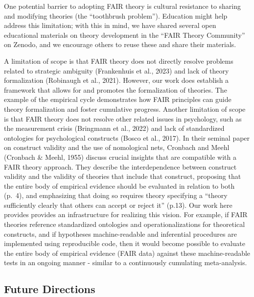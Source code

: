 \documentclass[man]{apa7}
\begin{document}
One potential barrier to adopting FAIR theory is cultural resistance to sharing and modifying theories (the ``toothbrush problem'').
Education might help address this limitation; with this in mind,
we have shared several open educational materials on theory development in the ``FAIR Theory Community'' on Zenodo, and we encourage others to reuse these and share their materials.

A limitation of scope is that FAIR theory does not directly resolve problems related to strategic ambiguity (Frankenhuis et al., 2023) and lack of theory formalization (Robinaugh et al., 2021).
However, our work does establish a framework that allows for and promotes the formalization of theories.
The example of the empirical cycle demonstrates how FAIR principles can guide theory formalization and foster cumulative progress.
Another limitation of scope is that FAIR theory does not resolve other related issues in psychology, such as the measurement crisis (Bringmann et al., 2022) and lack of standardized ontologies for psychological constructs (Bosco et al., 2017).
\label{nomological}{In their seminal paper on construct validity and the use of nomological nets, Cronbach and Meehl (Cronbach \& Meehl, 1955) discuss crucial insights that are compatible with a FAIR theory approach.
They describe the interdependence between construct validity and the validity of theories that include that construct,
proposing that the entire body of empirical evidence should be evaluated in relation to both (p.~4),
and emphasizing that doing so requires theory specifying a ``theory sufficiently clearly that others can accept or reject it'' (p.13).
Our work here provides provides an infrastructure for realizing this vision.
For example, if FAIR theories reference standardized ontologies and operationalizations for theoretical constructs,
and if hypotheses machine-readable and inferential procedures are implemented using reproducible code,
then it would become possible to evaluate the entire body of empirical evidence (FAIR data) against these machine-readable tests in an ongoing manner - similar to a continuously cumulating meta-analysis.}

\subsection{Future Directions}\label{future-directions}
\end{document}
